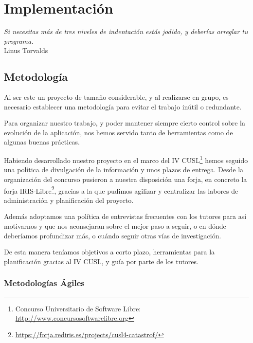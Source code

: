 
\chapter*{Implementación} \label{cap5}

\begin{flushright}
\begin{minipage}{7.85cm}
    {\em Si necesitas más de tres niveles de indentación estás jodido, y
    deberías arreglar tu programa.} \\  Linus Torvalds
\end{minipage}
\end{flushright}

\vspace*{5mm}

\section*{Metodología}

Al ser este un proyecto de tamaño considerable, y al realizarse en grupo, es
necesario establecer una metodología para evitar el trabajo inútil o redundante.

Para organizar nuestro trabajo, y poder mantener siempre cierto control sobre la
evolución de la aplicación, nos hemos servido tanto de herramientas como de
algunas buenas prácticas.

Habiendo desarrollado nuestro proyecto en el marco del IV CUSL\footnote{Concurso
Universitario de Software Libre: \url{http://www.concursosoftwarelibre.org}}
hemos seguido una política de divulgación de la información y unos plazos de
entrega. Desde la organización del concurso pusieron a nuestra disposición una
forja, en concreto la forja
IRIS-Libre\footnote{\url{https://forja.rediris.es/projects/cusl4-catastrof/}},
gracias a la que pudimos agilizar y centralizar las labores de administración y
planificación del proyecto.

Además adoptamos una política de entrevistas frecuentes con los tutores para
así motivarnos y que nos aconsejaran sobre el mejor paso a seguir, o en dónde
deberíamos profundizar más, o cuándo seguir otras vías de investigación.

De esta manera teníamos objetivos a corto plazo, herramientas para la
planificación gracias al IV CUSL, y guía por parte de los tutores.

\subsection*{Metodologías Ágiles}

